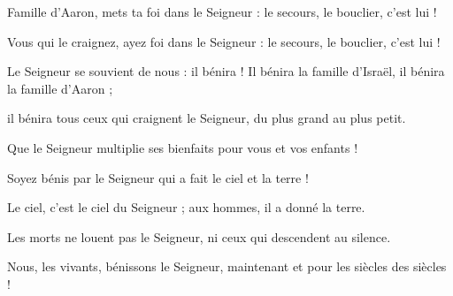 \item Famille d'Aaron, mets ta foi dans le Seigneur : le secours, le bouclier, c'est lui !

\item Vous qui le craignez, ayez foi dans le Seigneur : le secours, le bouclier, c'est lui !

\item Le Seigneur se souvient de nous : il bénira ! Il bénira la famille d'Israël, il bénira la famille d'Aaron ; 

\item il bénira tous ceux qui craignent le Seigneur, du plus grand au plus petit.

\item Que le Seigneur multiplie ses bienfaits pour vous et vos enfants !

\item Soyez bénis par le Seigneur qui a fait le ciel et la terre !

\item Le ciel, c'est le ciel du Seigneur ; aux hommes, il a donné la terre.

\item Les morts ne louent pas le Seigneur, ni ceux qui descendent au silence.

\item Nous, les vivants, bénissons le Seigneur, maintenant et pour les siècles des siècles !